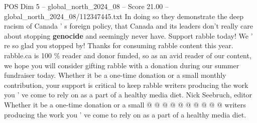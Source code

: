 \begin{textsample}{POS Dim 5 – global\_north\_2024\_08 – Score 21.00 – global\_north\_2024\_08/112347445.txt}
In doing so they demonstrate the deep racism of Canada ' s foreign policy, that Canada and its leaders don't really care about stopping \textbf{genocide} and seemingly never have.
Support rabble today!
We ' re so glad you stopped by!
Thanks for consuming rabble content this year. rabble.ca is 100 \% reader and donor funded, so as an avid reader of our content, we hope you will consider gifting rabble with a donation during our summer fundraiser today.
Whether it be a one-time donation or a small monthly contribution, your support is critical to keep rabble writers producing the work you ' ve come to rely on as a part of a healthy media diet.
Nick Seebruch, editor Whether it be a one-time donation or a small @ @ @ @ @ @ @ @ @ @ writers producing the work you ' ve come to rely on as a part of a healthy media diet.

\end{textsample}
